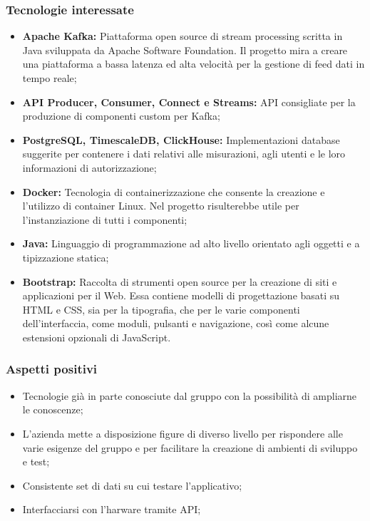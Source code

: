 	\subsubsection{Tecnologie interessate}
	\begin{itemize}
		\item \textbf{Apache Kafka:} Piattaforma open source di stream processing scritta in Java sviluppata da Apache Software Foundation. Il progetto mira a creare una piattaforma a bassa latenza ed alta velocità per la gestione di feed dati in tempo reale;
		\item \textbf{API Producer, Consumer, Connect e Streams:} API consigliate per la produzione di componenti custom per Kafka;
		\item \textbf{PostgreSQL, TimescaleDB, ClickHouse:} Implementazioni database suggerite per contenere i dati relativi alle misurazioni, agli utenti e le loro informazioni di autorizzazione;
		\item \textbf{Docker:} Tecnologia di containerizzazione che consente la creazione e l'utilizzo di container Linux. Nel progetto risulterebbe utile per l'instanziazione di tutti i componenti;   
		\item \textbf{Java:} Linguaggio di programmazione ad alto livello orientato agli oggetti e a tipizzazione statica;
		\item \textbf{Bootstrap:} Raccolta di strumenti open source per la creazione di siti e applicazioni per il Web. Essa contiene modelli di progettazione basati su HTML e CSS, sia per la tipografia, che per le varie componenti dell'interfaccia, come moduli, pulsanti e navigazione, così come alcune estensioni opzionali di JavaScript.
	\end{itemize}
	
	\subsubsection{Aspetti positivi}
	\begin{itemize}
		\item Tecnologie già in parte conosciute dal gruppo con la possibilità di ampliarne le conoscenze;
		\item L'azienda mette a disposizione figure di diverso livello per rispondere alle varie esigenze del gruppo e per facilitare la creazione di ambienti di sviluppo e test;
		\item Consistente set di dati su cui testare l'applicativo;
		\item Interfacciarsi con l'harware tramite API;
	\end{itemize}
	
